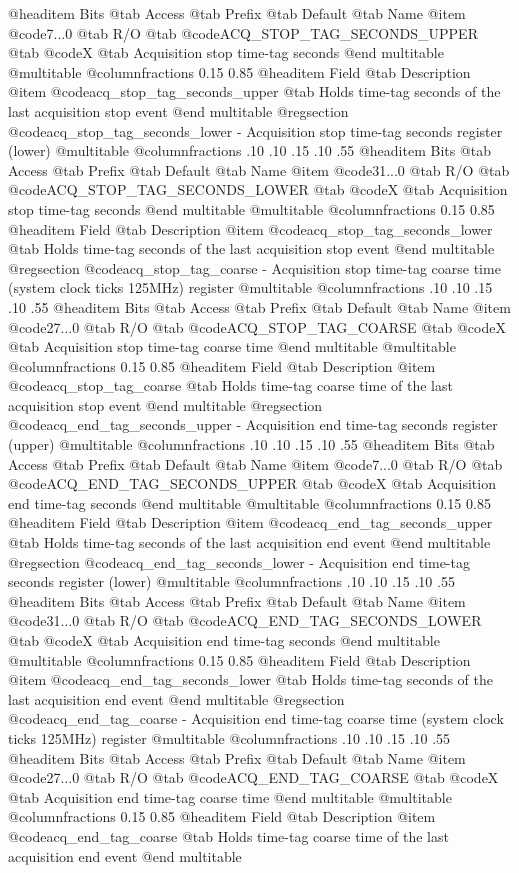 @headitem Bits @tab Access @tab Prefix @tab Default @tab Name
@item @code{7...0}
@tab R/O @tab
@code{ACQ_STOP_TAG_SECONDS_UPPER}
@tab @code{X} @tab 
Acquisition stop time-tag seconds
@end multitable
@multitable @columnfractions 0.15 0.85
@headitem Field @tab Description
@item @code{acq_stop_tag_seconds_upper} @tab Holds time-tag seconds of the last acquisition stop event
@end multitable
@regsection @code{acq_stop_tag_seconds_lower} - Acquisition stop time-tag seconds register (lower)
@multitable @columnfractions .10 .10 .15 .10 .55
@headitem Bits @tab Access @tab Prefix @tab Default @tab Name
@item @code{31...0}
@tab R/O @tab
@code{ACQ_STOP_TAG_SECONDS_LOWER}
@tab @code{X} @tab 
Acquisition stop time-tag seconds
@end multitable
@multitable @columnfractions 0.15 0.85
@headitem Field @tab Description
@item @code{acq_stop_tag_seconds_lower} @tab Holds time-tag seconds of the last acquisition stop event
@end multitable
@regsection @code{acq_stop_tag_coarse} - Acquisition stop time-tag coarse time (system clock ticks 125MHz) register
@multitable @columnfractions .10 .10 .15 .10 .55
@headitem Bits @tab Access @tab Prefix @tab Default @tab Name
@item @code{27...0}
@tab R/O @tab
@code{ACQ_STOP_TAG_COARSE}
@tab @code{X} @tab 
Acquisition stop time-tag coarse time
@end multitable
@multitable @columnfractions 0.15 0.85
@headitem Field @tab Description
@item @code{acq_stop_tag_coarse} @tab Holds time-tag coarse time of the last acquisition stop event
@end multitable
@regsection @code{acq_end_tag_seconds_upper} - Acquisition end time-tag seconds register (upper)
@multitable @columnfractions .10 .10 .15 .10 .55
@headitem Bits @tab Access @tab Prefix @tab Default @tab Name
@item @code{7...0}
@tab R/O @tab
@code{ACQ_END_TAG_SECONDS_UPPER}
@tab @code{X} @tab 
Acquisition end time-tag seconds
@end multitable
@multitable @columnfractions 0.15 0.85
@headitem Field @tab Description
@item @code{acq_end_tag_seconds_upper} @tab Holds time-tag seconds of the last acquisition end event
@end multitable
@regsection @code{acq_end_tag_seconds_lower} - Acquisition end time-tag seconds register (lower)
@multitable @columnfractions .10 .10 .15 .10 .55
@headitem Bits @tab Access @tab Prefix @tab Default @tab Name
@item @code{31...0}
@tab R/O @tab
@code{ACQ_END_TAG_SECONDS_LOWER}
@tab @code{X} @tab 
Acquisition end time-tag seconds
@end multitable
@multitable @columnfractions 0.15 0.85
@headitem Field @tab Description
@item @code{acq_end_tag_seconds_lower} @tab Holds time-tag seconds of the last acquisition end event
@end multitable
@regsection @code{acq_end_tag_coarse} - Acquisition end time-tag coarse time (system clock ticks 125MHz) register
@multitable @columnfractions .10 .10 .15 .10 .55
@headitem Bits @tab Access @tab Prefix @tab Default @tab Name
@item @code{27...0}
@tab R/O @tab
@code{ACQ_END_TAG_COARSE}
@tab @code{X} @tab 
Acquisition end time-tag coarse time
@end multitable
@multitable @columnfractions 0.15 0.85
@headitem Field @tab Description
@item @code{acq_end_tag_coarse} @tab Holds time-tag coarse time of the last acquisition end event
@end multitable

